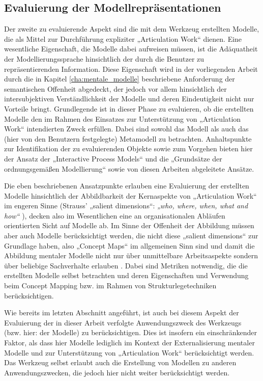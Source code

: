 \subsection{Evaluierung der Modellrepräsentationen}
\label{sub:eval_modell}

Der zweite zu evaluierende Aspekt sind die mit dem Werkzeug erstellten Modelle, die als Mittel zur Durchführung expliziter „Articulation Work“ dienen. Eine wesentliche Eigenschaft, die Modelle dabei aufweisen müssen, ist die Adäquatheit der Modellierungssprache hinsichtlich der durch die Benutzer zu repräsentierenden Information. Diese Eigenschaft wird in der vorliegenden Arbeit durch die in Kapitel \ref{cha:mentale_modelle} beschriebene Anforderung der semantischen Offenheit abgedeckt, der jedoch vor allem hinsichtlich der intersubjektiven Verständlichkeit der Modelle und deren Eindeutigkeit nicht nur Vorteile bringt. Grundlegende ist in dieser Phase zu evaluieren, ob die erstellten Modelle den im Rahmen des Einsatzes zur Unterstützung von „Articulation Work“ intendierten Zweck erfüllen. Dabei sind sowohl das Modell als auch das (hier von den Benutzern festgelegte) Metamodell zu betrachten. Anhaltspunkte zur Identifikation der zu evaluierenden Objekte sowie zum Vorgehen bieten hier der Ansatz der „Interactive Process Models“ \citep{Jorgensen04} und die „Grundsätze der ordnungsgemäßen Modellierung“ \citep{Becker00} sowie von diesen Arbeiten abgeleitete Ansätze.

Die eben beschriebenen Ansatzpunkte erlauben eine Evaluierung der erstellten Modelle hinsichtlich der Abbildbarkeit der Kernaspekte von „Articulation Work“ im engeren Sinne (Strauss' „salient dimensions“: \emph{„who, where, when, what and how“} \citep{Fjuk97}), decken also im Wesentlichen eine an organisationalen Abläufen orientierten Sicht auf Modelle ab. Im Sinne der Offenheit der Abbildung müssen aber auch Modelle berücksichtigt werden, die nicht diese „salient dimensions“ zur Grundlage haben, also „Concept Maps“ \citep{Novak06} im allgemeinen Sinn sind und damit die Abbildung mentaler Modelle nicht nur über unmittelbare Arbeitsaspekte sondern über beliebige Sachverhalte erlauben \citep{Ifenthaler06}. Dabei sind Metriken notwendig, die die erstellten Modelle selbst betrachten und deren Eigenschaften und Verwendung beim Concept Mapping bzw. im Rahmen von Strukturlegetechniken berücksichtigen.

Wie bereits im letzten Abschnitt angeführt, ist auch bei diesem Aspekt der Evaluierung der in dieser Arbeit verfolgte Anwendungszweck des Werkzeugs (bzw. hier: der Modelle) zu berücksichtigen. Dies ist insofern ein einschränkender Faktor, als dass hier Modelle lediglich im Kontext der Externalisierung mentaler Modelle und zur Unterstützung von „Articulation Work“ berücksichtigt werden. Das Werkzeug selbst erlaubt auch die Erstellung von Modellen zu anderen Anwendungszwecken, die jedoch hier nicht weiter berücksichtigt werden.  


